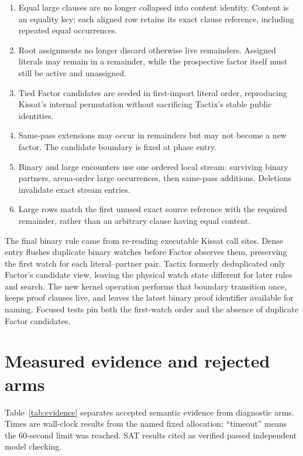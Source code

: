 \documentclass[11pt]{article}
\newcommand{\tactix}{Tactix}
\newcommand{\kissat}{Kissat}
\begin{document}
\begin{enumerate}[leftmargin=*,itemsep=2pt]
  \item Equal large clauses are no longer collapsed into content identity.
  Content is an equality key; each aligned row retains its exact clause
  reference, including repeated equal occurrences.
  \item Root assignments no longer discard otherwise live remainders.
  Assigned literals may remain in a remainder, while the prospective factor
  itself must still be active and unassigned.
  \item Tied Factor candidates are seeded in first-import literal order,
  reproducing \kissat{}'s internal permutation without sacrificing \tactix{}'s
  stable public identities.
  \item Same-pass extensions may occur in remainders but may not become a new
  factor.  The candidate boundary is fixed at phase entry.
  \item Binary and large encounters use one ordered local stream: surviving
  binary partners, arena-order large occurrences, then same-pass additions.
  Deletions invalidate exact stream entries.
  \item Large rows match the first unused exact source reference with the
  required remainder, rather than an arbitrary clause having equal content.
\end{enumerate}

The final binary rule came from re-reading executable \kissat{} call sites.
Dense entry flushes duplicate binary watches before Factor observes them,
preserving the first watch for each literal--partner pair.  \tactix{} formerly
deduplicated only Factor's candidate view, leaving the physical watch state
different for later rules and search.  The new kernel operation performs that
boundary transition once, keeps proof clauses live, and leaves the latest
binary proof identifier available for naming.  Focused tests pin both the
first-watch order and the absence of duplicate Factor candidates.

\section{Measured evidence and rejected arms}

Table~\ref{tab:evidence} separates accepted semantic evidence from diagnostic
arms.  Times are wall-clock results from the named fixed allocation; ``timeout''
means the 60-second limit was reached.  SAT results cited as verified passed
independent model checking.
\end{document}
